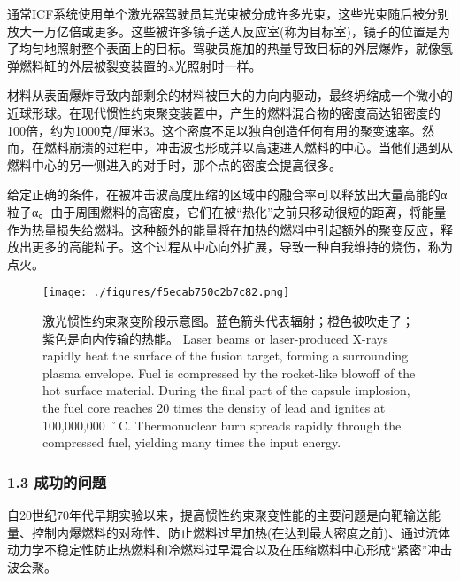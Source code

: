 通常ICF系统使用单个激光器驾驶员其光束被分成许多光束，这些光束随后被分别放大一万亿倍或更多。这些被许多镜子送入反应室(称为目标室)，镜子的位置是为了均匀地照射整个表面上的目标。驾驶员施加的热量导致目标的外层爆炸，就像氢弹燃料缸的外层被裂变装置的x光照射时一样。

材料从表面爆炸导致内部剩余的材料被巨大的力向内驱动，最终坍缩成一个微小的近球形球。在现代惯性约束聚变装置中，产生的燃料混合物的密度高达铅密度的100倍，约为1000克/厘米3。这个密度不足以独自创造任何有用的聚变速率。然而，在燃料崩溃的过程中，冲击波也形成并以高速进入燃料的中心。当他们遇到从燃料中心的另一侧进入的对手时，那个点的密度会提高很多。

给定正确的条件，在被冲击波高度压缩的区域中的融合率可以释放出大量高能的α粒子α。由于周围燃料的高密度，它们在被“热化”之前只移动很短的距离，将能量作为热量损失给燃料。这种额外的能量将在加热的燃料中引起额外的聚变反应，释放出更多的高能粒子。这个过程从中心向外扩展，导致一种自我维持的烧伤，称为点火。
\begin{figure}[ht]
\centering
\texttt{[image: ./figures/f5ecab750c2b7c82.png]}
\caption{激光惯性约束聚变阶段示意图。蓝色箭头代表辐射；橙色被吹走了；紫色是向内传输的热能。 Laser beams or laser-produced X-rays rapidly heat the surface of the fusion target, forming a surrounding plasma envelope. Fuel is compressed by the rocket-like blowoff of the hot surface material. During the final part of the capsule implosion, the fuel core reaches 20 times the density of lead and ignites at 100,000,000 ˚C. Thermonuclear burn spreads rapidly through the compressed fuel, yielding many times the input energy.} \label{fig_GXYS_2}
\end{figure}
\subsubsection{1.3 成功的问题}
自20世纪70年代早期实验以来，提高惯性约束聚变性能的主要问题是向靶输送能量、控制内爆燃料的对称性、防止燃料过早加热(在达到最大密度之前)、通过流体动力学不稳定性防止热燃料和冷燃料过早混合以及在压缩燃料中心形成“紧密”冲击波会聚。

